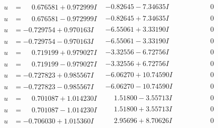 \documentclass[1p]{elsarticle_modified}
\theoremstyle{definition}
\begin{document}
$$\begin{array}{c|c|c}
\begin{aligned}
u &= \phantom{-}0.676581 + 0.972999 I\end{aligned}
 & -0.82645 - 7.34635 I & \phantom{-0.000000 } 0 \\ \hline\begin{aligned}
u &= \phantom{-}0.676581 - 0.972999 I\end{aligned}
 & -0.82645 + 7.34635 I & \phantom{-0.000000 } 0 \\ \hline\begin{aligned}
u &= -0.729754 + 0.970163 I\end{aligned}
 & -6.55061 + 3.33190 I & \phantom{-0.000000 } 0 \\ \hline\begin{aligned}
u &= -0.729754 - 0.970163 I\end{aligned}
 & -6.55061 - 3.33190 I & \phantom{-0.000000 } 0 \\ \hline\begin{aligned}
u &= \phantom{-}0.719199 + 0.979027 I\end{aligned}
 & -3.32556 - 6.72756 I & \phantom{-0.000000 } 0 \\ \hline\begin{aligned}
u &= \phantom{-}0.719199 - 0.979027 I\end{aligned}
 & -3.32556 + 6.72756 I & \phantom{-0.000000 } 0 \\ \hline\begin{aligned}
u &= -0.727823 + 0.985567 I\end{aligned}
 & -6.06270 + 10.74590 I & \phantom{-0.000000 } 0 \\ \hline\begin{aligned}
u &= -0.727823 - 0.985567 I\end{aligned}
 & -6.06270 - 10.74590 I & \phantom{-0.000000 } 0 \\ \hline\begin{aligned}
u &= \phantom{-}0.701087 + 1.014230 I\end{aligned}
 & \phantom{-}1.51800 - 3.55713 I & \phantom{-0.000000 } 0 \\ \hline\begin{aligned}
u &= \phantom{-}0.701087 - 1.014230 I\end{aligned}
 & \phantom{-}1.51800 + 3.55713 I & \phantom{-0.000000 } 0 \\ \hline\begin{aligned}
u &= -0.706030 + 1.015360 I\end{aligned}
 & \phantom{-}2.95696 + 8.70626 I & \phantom{-0.000000 } 0 \\ \hline\begin{aligned}

\end{aligned}
\end{array}$$
\end{document}
